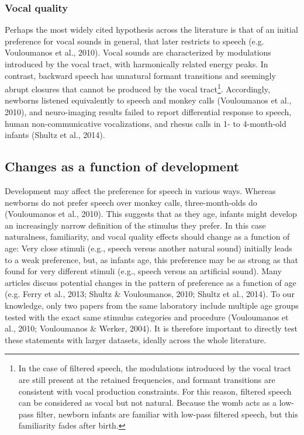 \documentclass[man]{apa6}
\begin{document}
\hypertarget{vocal-quality}{%
\subsubsection{Vocal quality}\label{vocal-quality}}

Perhaps the most widely cited hypothesis across the literature is that of an initial preference for vocal sounds in general, that later restricts to speech (e.g. Vouloumanos et al., 2010). Vocal sounds are characterized by modulations introduced by the vocal tract, with harmonically related energy peaks. In contrast, backward speech has unnatural formant transitions and seemingly abrupt closures that cannot be produced by the vocal tract\footnote{In the case of filtered speech, the modulations introduced by the vocal tract are still present at the retained frequencies, and formant transitions are consistent with vocal production constraints. For this reason, filtered speech can be considered as vocal but not natural. Because the womb acts as a low-pass filter, newborn infants are familiar with low-pass filtered speech, but this familiarity fades after birth.}. Accordingly, newborns listened equivalently to speech and monkey calls (Vouloumanos et al., 2010), and neuro-imaging results failed to report differential response to speech, human non-communicative vocalizations, and rhesus calls in 1- to 4-month-old infants (Shultz et al., 2014).

\hypertarget{changes-as-a-function-of-development}{%
\subsection{Changes as a function of development}\label{changes-as-a-function-of-development}}

Development may affect the preference for speech in various ways. Whereas newborns do not prefer speech over monkey calls, three-month-olds do (Vouloumanos et al., 2010). This suggests that as they age, infants might develop an increasingly narrow definition of the stimulus they prefer. In this case naturalness, familiarity, and vocal quality effects should change as a function of age: Very close stimuli (e.g., speech versus another natural sound) initially leads to a weak preference, but, as infants age, this preference may be as strong as that found for very different stimuli (e.g., speech versus an artificial sound).
Many articles discuss potential changes in the pattern of preference as a function of age (e.g. Ferry et al., 2013; Shultz \& Vouloumanos, 2010; Shultz et al., 2014). To our knowledge, only two papers from the same laboratory include multiple age groups tested with the exact same stimulus categories and procedure (Vouloumanos et al., 2010; Vouloumanos \& Werker, 2004). It is therefore important to directly test these statements with larger datasets, ideally across the whole literature.
\end{document}
